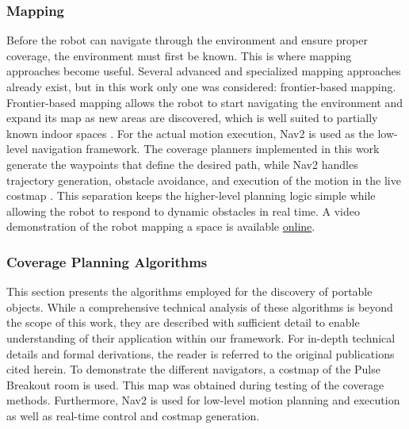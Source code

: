     \subsubsection{Mapping}

    Before the robot can navigate through the environment and ensure proper coverage, the environment must first be known. This is where mapping approaches become useful. Several advanced and specialized mapping approaches already exist, but in this work only one was considered: frontier-based mapping. Frontier-based mapping allows the robot to start navigating the environment and expand its map as new areas are discovered, which is well suited to partially known indoor spaces \cite{SlamTBX2021}.
    For the actual motion execution, Nav2 is used as the low-level navigation framework. The coverage planners implemented in this work generate the waypoints that define the desired path, while Nav2 handles trajectory generation, obstacle avoidance, and execution of the motion in the live costmap \cite{macenski2020marathon2}. This separation keeps the higher-level planning logic simple while allowing the robot to respond to dynamic obstacles in real time. A video demonstration of the robot mapping a space is available \href{https://www.youtube.com/watch?v=zg_rNDsQURY}{online}.
    \subsubsection{Coverage Planning Algorithms}\label{sec:coverage}

    This section presents the algorithms employed for the discovery of portable objects. While a comprehensive technical analysis of these algorithms is beyond the scope of this work, they are described with sufficient detail to enable understanding of their application within our framework. For in-depth technical details and formal derivations, the reader is referred to the original publications cited herein.
    To demonstrate the different navigators, a costmap of the Pulse Breakout room is used. This map was obtained during testing of the coverage methods.
    Furthermore, Nav2 \cite{macenski2020marathon2} is used for low-level motion planning and execution as well as real-time control and costmap generation.


